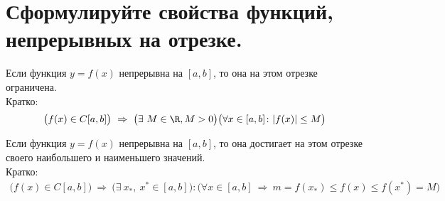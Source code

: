 \section{Сформулируйте свойства функций, непрерывных на отрезке.}

\begin{theorem}
  Если функция $y=f(x)$ непрерывна на $[a, b]$, то она на этом отрезке ограничена.\\
  Кратко: \vspace{-\topsep}
  \begin{gather*}
    \big(f(x) \in C[a, b]\big)\ \Rightarrow\ \big(\exists\ M \in \R, M>0\big) \big(\forall x \in [a, b]\colon |f(x)| \le M\big)
  \end{gather*}
\end{theorem}
\begin{theorem}
  Если функция $y = f(x)$ непрерывна на $[a, b]$, то она достигает на этом отрезке своего наибольшего и наименьшего значений.\\
  Кратко:\vspace{-\topsep}
  \begin{gather*}
    \big(f(x) \in C[a, b]\big)\ \Rightarrow\ \big(\exists\ x_{*},\ x^{*} \in [a, b]\big)\colon (\forall x \in [a, b]\ \Rightarrow\ m = f(x_{*}) \le f(x) \le f(x^{*}) = M\big)
  \end{gather*}
\end{theorem} \vspace{-\topsep}
